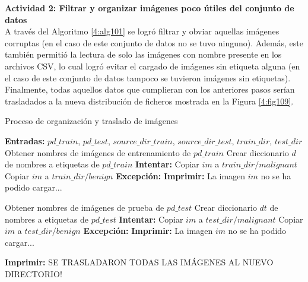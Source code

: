 \textbf{Actividad 2: Filtrar y organizar imágenes poco útiles del conjunto de datos}
\\
A través del Algoritmo \ref{4:alg101} se logró filtrar y obviar aquellas imágenes corruptas (en el caso de este conjunto de datos no se tuvo ninguno). Además, este también permitió la lectura de solo las imágenes con nombre presente en los archivos CSV, lo cual logró evitar el cargado de imágenes sin etiqueta alguna (en el caso de este conjunto de datos tampoco se tuvieron imágenes sin etiquetas). Finalmente, todas aquellos datos que cumplieran con los anteriores pasos serían trasladados a la nueva distribución de ficheros mostrada en la Figura \ref{4:fig109}.
\begin{algorithm}[H]
	\caption{Proceso de organización y traslado de imágenes}
	\label{4:alg101}
	\begin{algorithmic}[1]
		\State \textbf{Entradas:} $pd\_train$, $pd\_test$, $source\_dir\_train$, $source\_dir\_test$, $train\_dir$, $test\_dir$
		\State Obtener nombres de imágenes de entrenamiento de $pd\_train$
		\State Crear diccionario $d$ de nombres a etiquetas de $pd\_train$
			\State \textbf{Intentar:}
				\State Copiar $im$ a $train\_dir/malignant$
				\State Copiar $im$ a $train\_dir/benign$
			\EndIf
			\State \textbf{Excepción:}
			\State \textbf{Imprimir:} La imagen $im$ no se ha podido cargar...
		\EndFor

		\State Obtener nombres de imágenes de prueba de $pd\_test$
		\State Crear diccionario $dt$ de nombres a etiquetas de $pd\_test$
			\State \textbf{Intentar:}
				\State Copiar $im$ a $test\_dir/malignant$
				\State Copiar $im$ a $test\_dir/benign$
			\EndIf
			\State \textbf{Excepción:}
			\State \textbf{Imprimir:} La imagen $im$ no se ha podido cargar...
		\EndFor

		\State \textbf{Imprimir:} SE TRASLADARON TODAS LAS IMÁGENES AL NUEVO DIRECTORIO!
	\end{algorithmic}
\end{algorithm}

